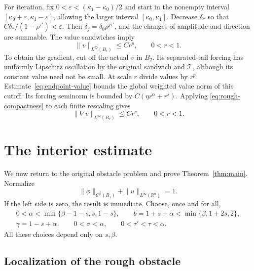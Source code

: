 \documentclass[11pt]{article}
\numberwithin{equation}{section}
\newcommand{\R}{\mathbb R}
\newcommand{\T}{\mathcal T}
\begin{document}
For iteration, fix $0<\varepsilon<(\kappa_1-\kappa_0)/2$ and start in
the nonempty interval $[\kappa_0+\varepsilon,\kappa_1-\varepsilon]$,
allowing the larger interval $[\kappa_0,\kappa_1]$. Decrease $\delta_*$
so that $C\delta_* /(1-\rho^{\tau'})<\varepsilon$. Then
$\delta_j=\delta_0\rho^{j\tau'}$, and the changes of amplitude and direction
are summable. The value sandwiches imply
\begin{equation}\label{eq:endpoint-value}
                           \|v\|_{L^\infty(B_r)}\leq Cr^p,
                                  \qquad 0<r<1.
\end{equation}
To obtain the gradient, cut off the actual $v$ in $B_2$. Its separated-tail
forcing has uniformly Lipschitz oscillation by the original sandwich and
$\T$, although its constant value need not be small. At scale $r$ divide
values by $r^p$. Estimate~\eqref{eq:endpoint-value} bounds the global
weighted value norm of this cutoff. Its forcing seminorm is bounded by
$C(\eta r^\alpha+r^s)$. Applying \eqref{eq:rough-compactness} to each finite
rescaling gives
\begin{equation}\label{eq:endpoint-gradient}
                           \|\nabla v\|_{L^\infty(B_r)}\leq Cr^s,
                                  \qquad 0<r<1.
\end{equation}

\section{The interior estimate}\label{sec:interior}

We now return to the original obstacle problem and prove
Theorem~\ref{thm:main}. Normalize
\begin{equation}\label{eq:normalization}
             \|\phi\|_{C^\beta(B_1)}+\|u\|_{L^\infty(\R^n)}=1.
\end{equation}
If the left side is zero, the result is immediate. Choose, once and for all,
\begin{equation}\label{eq:exponents}
 \begin{gathered}
 0<\alpha<\min\{\beta-1-s,s,1-s\},\qquad
 b=1+s+\alpha<\min\{\beta,1+2s,2\},\\
 \gamma=1-s+\alpha,\qquad 0<\sigma<\alpha,\qquad
 0<\tau'<\tau<\alpha.
 \end{gathered}
\end{equation}
All these choices depend only on $s,\beta$.

\subsection{Localization of the rough obstacle}
\end{document}
